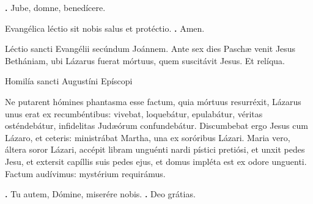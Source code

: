\begin{small}
\textbf{\Vbar.} Jube, domne, benedícere.

Evangélica léctio sit nobis salus et protéctio. \textbf{\Rbar.} Amen.
\end{small}


Léctio sancti Evangélii secúndum Joánnem. 
Ante sex dies Paschæ venit Jesus Bethániam, ubi Lázarus fuerat mórtuus, quem suscitávit Jesus. Et relíqua.


Homilía sancti Augustíni Epíscopi

Ne putarent hómines phantasma esse factum, quia mórtuus resurréxit, Lázarus unus erat ex recumbéntibus: vivebat, loquebátur, epulabátur, véritas osténdebátur, infidelitas Judæórum confundebátur. Discumbebat ergo Jesus cum Lázaro, et ceteris: ministrábat Martha, una ex soróribus Lázari. Maria vero, áltera soror Lázari, accépit libram unguénti nardi pístici pretiósi, et unxit pedes Jesu, et extersit capíllis suis pedes ejus, et domus impléta est ex odore unguenti. Factum audívimus: mystérium requirámus.

\textbf{\Vbar.} Tu autem, Dómine, miserére nobis.
\textbf{\Rbar.} Deo grátias.

